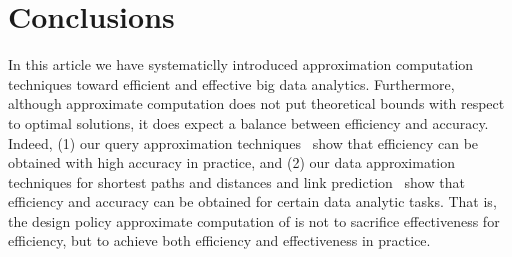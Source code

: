 \section{Conclusions}
\label{sec-conclusion}

In this article we have systematiclly introduced approximation computation techniques toward efficient and effective big data analytics.
Furthermore, although approximate computation does not put
theoretical bounds with respect to optimal solutions, it does expect a balance between efficiency and accuracy. Indeed, (1) our query approximation techniques~\cite{tods-MaCFHW14,LinMZWH17,MaHWLH17} show that efficiency can be obtained with high accuracy in practice, and (2) our data approximation techniques for shortest paths and distances and link prediction~\cite{MaFLWCH16,DuanMAMH17} show that efficiency and accuracy can be obtained for certain data analytic tasks. That is, the design policy approximate computation of is not to sacrifice effectiveness for efficiency, but to achieve both efficiency and effectiveness in practice.

